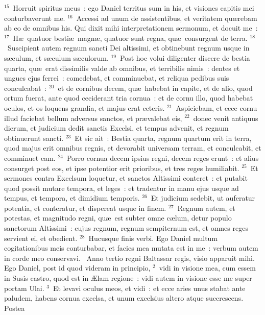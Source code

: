 ${}^{15}$~Horruit spiritus meus~: ego Daniel territus sum in his, et visiones capitis mei conturbaverunt me.
${}^{16}$~Accessi ad unum de assistentibus, et veritatem qu\ae rebam ab eo de omnibus his. Qui dixit mihi interpretationem sermonum, et docuit me~:
${}^{17}$~H\ae\ quatuor besti\ae\ magn\ae , quatuor sunt regna, qu\ae\ consurgent de terra.
${}^{18}$~Suscipient autem regnum sancti Dei altissimi, et obtinebunt regnum usque in s\ae culum, et s\ae culum s\ae culorum.
${}^{19}$~Post hoc volui diligenter discere de bestia quarta, qu\ae\ erat dissimilis valde ab omnibus, et terribilis nimis~: dentes et ungues ejus ferrei~: comedebat, et comminuebat, et reliqua pedibus suis conculcabat~:
${}^{20}$~et de cornibus decem, qu\ae\ habebat in capite, et de alio, quod ortum fuerat, ante quod ceciderant tria cornua~: et de cornu illo, quod habebat oculos, et os loquens grandia, et majus erat ceteris.
${}^{21}$~Aspiciebam, et ecce cornu illud faciebat bellum adversus sanctos, et pr\ae valebat eis,
${}^{22}$~donec venit antiquus dierum, et judicium dedit sanctis Excelsi, et tempus advenit, et regnum obtinuerunt sancti.
${}^{23}$~Et sic ait~: Bestia quarta, regnum quartum erit in terra, quod majus erit omnibus regnis, et devorabit universam terram, et conculcabit, et comminuet eam.
${}^{24}$~Porro cornua decem ipsius regni, decem reges erunt~: et alius consurget post eos, et ipse potentior erit prioribus, et tres reges humiliabit.
${}^{25}$~Et sermones contra Excelsum loquetur, et sanctos Altissimi conteret~: et putabit quod possit mutare tempora, et leges~: et tradentur in manu ejus usque ad tempus, et tempora, et dimidium temporis.
${}^{26}$~Et judicium sedebit, ut auferatur potentia, et conteratur, et dispereat usque in finem.
${}^{27}$~Regnum autem, et potestas, et magnitudo regni, qu\ae\ est subter omne c\ae lum, detur populo sanctorum Altissimi~: cujus regnum, regnum sempiternum est, et omnes reges servient ei, et obedient.
${}^{28}$~Hucusque finis verbi. Ego Daniel multum cogitationibus meis conturbabar, et facies mea mutata est in me~: verbum autem in corde meo conservavi.
~\lettrine[lines=10,image=true,loversize=0.05,lraise=-0.03]{A}{}nno tertio regni Baltassar regis, visio apparuit mihi. Ego Daniel, post id quod videram in principio,
${}^{2}$~vidi in visione mea, cum essem in Susis castro, quod est in \AE lam regione~: vidi autem in visione esse me super portam Ulai.
${}^{3}$~Et levavi oculus meos, et vidi~: et ecce aries unus stabat ante paludem, habens cornua excelsa, et unum excelsius altero atque succrescens. Postea
